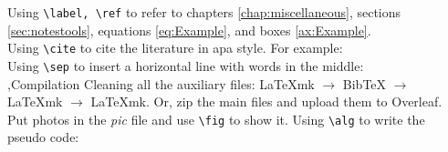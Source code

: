 \documentclass[12pt]{report}
\begin{document}
\no Using \verb=\label, \ref= to refer to chapters \ref{chap:miscellaneous},
sections \ref{sec:notestools}, equations \ref{eq:Example}, and boxes \ref{ax:Example}.\\
\no Using \verb=\cite= to cite the literature in apa style. For example:
\cite{Klein2020}\\
\no Using \verb=\sep= to insert a horizontal line with words in the middle:\\
\sep{Compilation}
Cleaning all the auxiliary files: LaTeXmk $\rightarrow$ BibTeX $\rightarrow$ LaTeXmk $\rightarrow$ LaTeXmk.
Or, zip the main files and upload them to Overleaf.\\
Put photos in the \textit{pic} file and use \verb|\fig| to show it.
Using \verb=\alg= to write the pseudo code:

\newpage
\listoffigures

\newpage
\listofalgorithms



\end{document}
